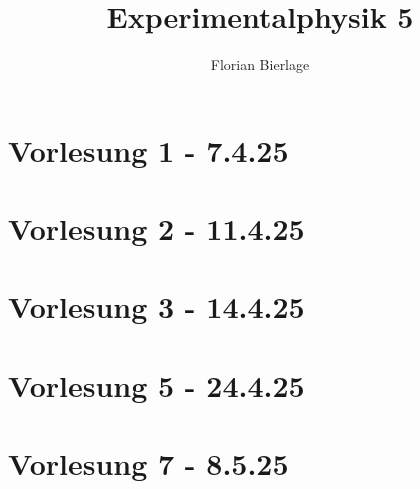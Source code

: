 \documentclass[]{scrbook}
\title{Experimentalphysik 5}
\author{Florian Bierlage}
\begin{document}
\maketitle
\newpage
\tableofcontents
\newpage

\section*{Vorlesung 1 - 7.4.25} 


\section*{Vorlesung 2 - 11.4.25}


\section*{Vorlesung 3 - 14.4.25}


\section*{Vorlesung 5 - 24.4.25}


\section*{Vorlesung 7 - 8.5.25}

\end{document}
